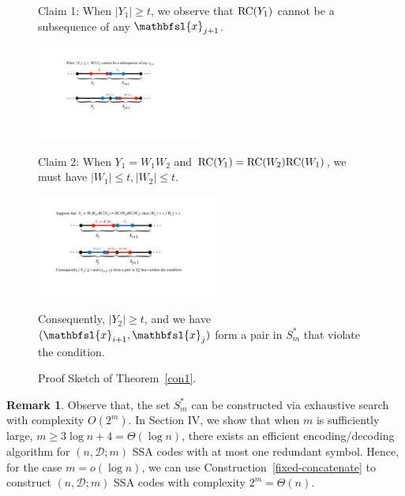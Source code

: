 \documentclass[conference]{IEEEtran}
\DeclarePairedDelimiter\ceil{\lceil}{\rceil}
\theoremstyle{plain}
\newtheorem{corollary}{Corollary}
\theoremstyle{definition}
\newtheorem{remark}{Remark}
\newcommand{\C}{{\mathcal C}}
\newcommand{\D}{{\mathcal D}}
\newcommand{\by}{{\mathbfsl y}}
\newcommand{\bx}{{\mathbfsl{x}}}
\newcommand{\bz}{{\mathbfsl{z}}}
\renewcommand{\ge}{\geqslant}
\renewcommand{\le}{\leqslant}
\begin{document}
\begin{figure}[h]
\caption*{Claim 1: When $|Y_1|\ge t$, we observe that ${\rm RC}(Y_1)$ cannot be a subsequence of any $\bx_{j+1}$.}
\begin{center}
\includegraphics[width=5.5cm]{proof2.pdf}
\end{center}
\caption*{Claim 2: When $Y_1=W_1W_2$ and ${\rm RC}(Y_1)={\rm RC}(W_2){\rm RC}(W_1)$, we must have $|W_1|\le t, |W_2|\le t$.}
\begin{center}
\includegraphics[width=6cm]{proof1.pdf}
\end{center}
\caption*{Consequently, $|Y_2| \ge t$, and we have $(\bx_{i+1},\bx_j)$ form a pair in $S_m^*$ that violate the condition.}
\caption{Proof Sketch of Theorem~\ref{con1}.}
\label{fig2}
\end{figure}
\begin{remark} Observe that, the set $S_m^*$ can be constructed via exhaustive search with complexity $O(2^m)$. In Section IV, we show that when $m$ is sufficiently large, $m\ge 3\log n+4=\Theta(\log n)$, there exists an efficient encoding/decoding algorithm for $(n,\D;m)$ SSA codes with at most one redundant symbol. Hence, for the case $m=o(\log n)$, we can use Construction~\ref{fixed-concatenate} to construct $(n,\D;m)$ SSA codes with complexity $2^m=\Theta(n)$. %
\end{remark} 

\end{document}
